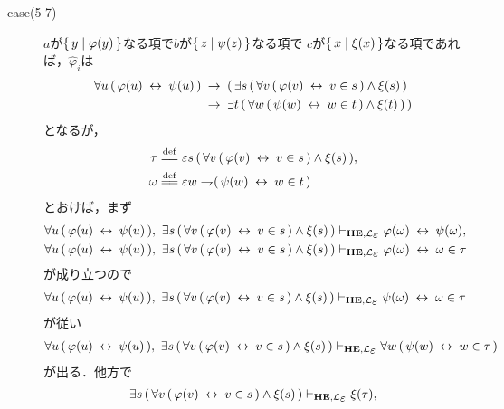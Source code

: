 \begin{metaprf}
\begin{description}
\begin{description}
					\item[case(5-7)] $a$が$\{\, y \mid \varphi(y)\, \}$なる項で$b$が$\{\, z \mid \psi(z)\, \}$なる項で
						$c$が$\{\, x \mid \xi(x)\, \}$なる項であれば，$\widehat{\varphi}_{i}$は
						\begin{align}
							\forall u\, (\, \varphi(u) \hspace{0.25em}\leftrightarrow\hspace{0.25em} \psi(u)\, ) 
							&\hspace{0.25em}\rightarrow\hspace{0.25em} (\, \exists s\, (\, \forall v\, (\, \varphi(v) \hspace{0.25em}\leftrightarrow\hspace{0.25em} v \in s\, ) \wedge \xi(s)\, ) \\
							&\hspace{0.25em}\rightarrow\hspace{0.25em} \exists t\, (\, \forall w\, (\, \psi(w) \hspace{0.25em}\leftrightarrow\hspace{0.25em} w \in t\, ) \wedge \xi(t)\, )\, )
						\end{align}
						となるが，
						\begin{align}
							\tau &\defeq \varepsilon s\, (\, \forall v\, (\, \varphi(v) \lrarrow v \in s\, ) \wedge \xi(s)\, ), \\
							\omega &\defeq \varepsilon w \negation (\, \psi(w) \lrarrow w \in t\, )
						\end{align}
						とおけば，まず
						\begin{align}
							\forall u\, (\, \varphi(u) \lrarrow \psi(u)\, ),\ 
							\exists s\, (\, \forall v\, (\, \varphi(v) \lrarrow v \in s\, ) \wedge \xi(s)\, )
							&\provable{\mbox{{\bf HE}},\lang{\varepsilon}} \varphi(\omega) \lrarrow \psi(\omega), \\
							\forall u\, (\, \varphi(u) \lrarrow \psi(u)\, ),\ 
							\exists s\, (\, \forall v\, (\, \varphi(v) \lrarrow v \in s\, ) \wedge \xi(s)\, )
							&\provable{\mbox{{\bf HE}},\lang{\varepsilon}} \varphi(\omega) \lrarrow \omega \in \tau
						\end{align}
						が成り立つので
						\begin{align}
							\forall u\, (\, \varphi(u) \lrarrow \psi(u)\, ),\ 
							\exists s\, (\, \forall v\, (\, \varphi(v) \lrarrow v \in s\, ) \wedge \xi(s)\, )
							\provable{\mbox{{\bf HE}},\lang{\varepsilon}} \psi(\omega) \lrarrow \omega \in \tau
						\end{align}
						が従い
						\begin{align}
							\forall u\, (\, \varphi(u) \lrarrow \psi(u)\, ),\ 
							\exists s\, (\, \forall v\, (\, \varphi(v) \lrarrow v \in s\, ) \wedge \xi(s)\, )
							\provable{\mbox{{\bf HE}},\lang{\varepsilon}} \forall w\, (\, \psi(w) \lrarrow w \in \tau\, )
						\end{align}
						が出る．他方で
						\begin{align}
							\exists s\, (\, \forall v\, (\, \varphi(v) \lrarrow v \in s\, ) \wedge \xi(s)\, )
							\provable{\mbox{{\bf HE}},\lang{\varepsilon}} \xi(\tau), \\

\end{align}
\end{description}
\end{description}
\end{metaprf}
